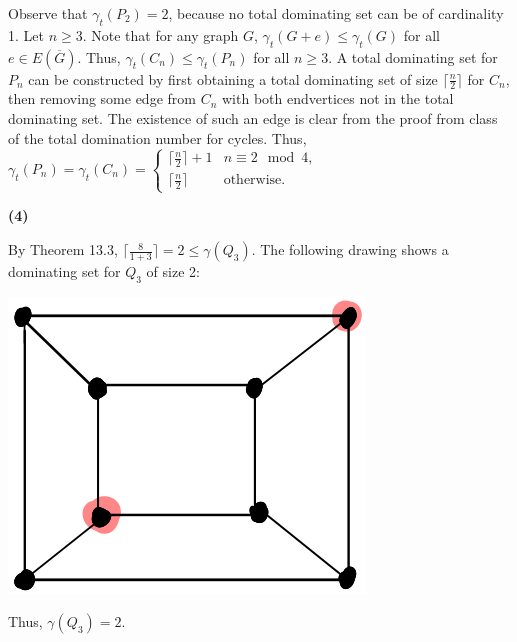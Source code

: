 \documentclass[12pt]{article}
\begin{document}
    Observe that $\gamma_t(P_2) = 2$, because no total dominating set can be of cardinality 1.
    Let $n \geq 3$.
    Note that for any graph $G$, $\gamma_t(G + e) \leq \gamma_t(G)$ for all $e \in E(\overline G)$.
    Thus, $\gamma_t(C_n) \leq \gamma_t(P_n)$ for all $n \geq 3$.
    A total dominating set for $P_n$ can be constructed by first obtaining a total dominating set of size $\lceil \frac n2 \rceil$ for $C_n$, then removing some edge from $C_n$ with both endvertices not in the total dominating set.
    The existence of such an edge is clear from the proof from class of the total domination number for cycles.
    Thus, $\gamma_t(P_n) = \gamma_t(C_n) = \begin{cases} \lceil \frac n2 \rceil + 1 & n \equiv 2 \mod 4, \\ \lceil \frac n2 \rceil & \text{otherwise}. \end{cases}$

\newpage\noindent\textbf{(4)} 

    By Theorem 13.3, $\lceil \frac 8{1 + 3} \rceil = 2 \leq \gamma(Q_3)$.
    The following drawing shows a dominating set for $Q_3$ of size 2:
    \begin{center} \includegraphics[scale=.5]{4.png} \end{center}
    Thus, $\gamma(Q_3) = 2$.
\end{document}
